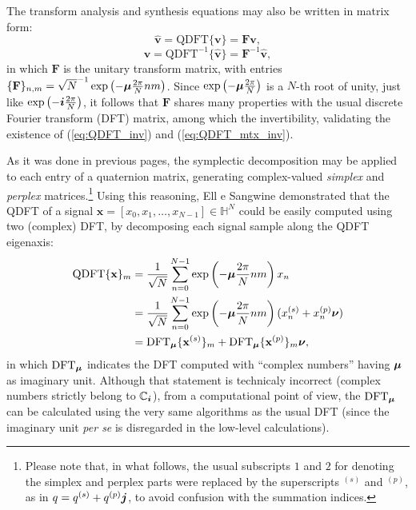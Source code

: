 The transform analysis and synthesis equations may also be written in matrix form:
\begin{equation}
    \label{eq:QDFT}
    \widehat{\mathbf{v}} = \text{QDFT}\{ \mathbf{v} \} = \mathbf{F} \mathbf{v},
\end{equation}
\begin{equation}
    \label{eq:QDFT_mtx_inv}
    \mathbf{v} = \text{QDFT}^{-1}\{ \widehat{\mathbf{v}} \} = \mathbf{F}^{-1} \widehat{\mathbf{v}},
\end{equation}
in which $ \mathbf{F} $ is the unitary transform matrix,
with entries $ \{\mathbf{F}\}_{n,m} = \sqrt{N}^{-1} \exp \left( -\boldsymbol{\mu} \frac{2\pi}{N} nm \right)$. Since  $ \exp \left( -\boldsymbol{\mu} \frac{2\pi}{N} \right) $ is a $ N $-th root of unity, just like $ \exp \left( -\boldsymbol{i} \frac{2\pi}{N} \right) $, it follows that $ \mathbf{F} $ shares many properties with the usual discrete Fourier transform (DFT) matrix, among which the invertibility, validating the existence of (\ref{eq:QDFT_inv}) and (\ref{eq:QDFT_mtx_inv}).

As it was done in previous pages, the symplectic decomposition may be applied to each entry of a quaternion matrix, generating complex-valued \emph{simplex} and \emph{perplex} matrices.\footnote{Please note that, in what follows, the usual subscripts $1$ and $2$ for denoting the simplex and perplex parts were replaced by the superscripts $^{(s)}$ and $^{(p)}$, as in $q = q^{(s)} + q^{(p)} \boldsymbol{j}$, to avoid confusion with the summation indices.} Using this reasoning, Ell e Sangwine \cite{ell2014quaternion} demonstrated that the QDFT of a signal $ \mathbf{x} = [x_0, x_1, \dots, x_{N-1}] \in \mathbb{H}^N $ could be easily computed using two (complex) DFT, by decomposing each signal sample along the QDFT eigenaxis:
\begin{equation}
    \begin{aligned}
        \text{QDFT}\{ \mathbf{x} \}_m & = \frac{1}{\sqrt{N}} \sum_{n=0}^{N-1} \exp \left( -\boldsymbol{\mu} \frac{2\pi}{N} nm \right) x_n                         \\
                                      & = \frac{1}{\sqrt{N}} \sum_{n=0}^{N-1} \exp \left( -\boldsymbol{\mu} \frac{2\pi}{N} nm \right) (x_n^{(s)} + x_n^{(p)}\boldsymbol{\nu}) \\
                                      & = \text{DFT}_{\boldsymbol{\mu}}\{ \mathbf{x}^{(s)} \}_m +
        \text{DFT}_{\boldsymbol{\mu}}\{ \mathbf{x}^{(p)} \}_m \boldsymbol{\nu},
    \end{aligned}
\end{equation}
in which $ \text{DFT}_{\boldsymbol{\mu}} $ indicates the DFT computed with ``complex numbers'' having $ \boldsymbol{\mu} $ as imaginary unit.
Although that statement is technicaly incorrect (complex numbers strictly belong to $\mathbb{C}_{\boldsymbol{i}}$), from a computational point of view, the $ \text{DFT}_{\boldsymbol{\mu}} $ can be calculated using the very same algorithms as the usual DFT (since the imaginary unit \textit{per se} is disregarded in the low-level calculations).


